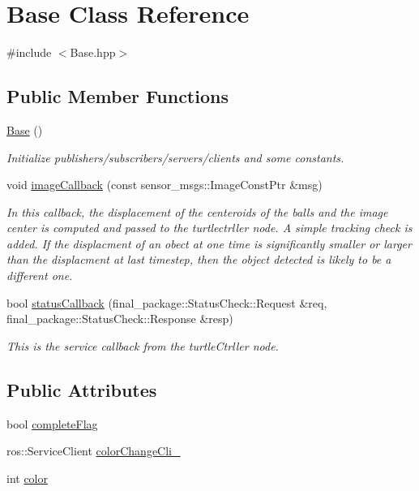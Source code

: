 \hypertarget{classBase}{}\section{Base Class Reference}
\label{classBase}


{\ttfamily \#include $<$Base.\+hpp$>$}

\subsection*{Public Member Functions}
\begin{DoxyCompactItemize}
\item 
\hyperlink{classBase_a5ffe0568374d8b9b4c4ec32953fd6453}{Base} ()
\begin{DoxyCompactList}\small\item\em Initialize publishers/subscribers/servers/clients and some constants. \end{DoxyCompactList}\item 
void \hyperlink{classBase_a07d8eb5e372ccab3c866c5abdce90d64}{image\+Callback} (const sensor\+\_\+msgs\+::\+Image\+Const\+Ptr \&msg)
\begin{DoxyCompactList}\small\item\em In this callback, the displacement of the centeroids of the balls and the image center is computed and passed to the turtlectrller node. A simple tracking check is added. If the displacment of an obect at one time is significantly smaller or larger than the displacment at last timestep, then the object detected is likely to be a different one. \end{DoxyCompactList}\item 
bool \hyperlink{classBase_a8b091924a7e8398ea11babdab370fd3f}{status\+Callback} (final\+\_\+package\+::\+Status\+Check\+::\+Request \&req, final\+\_\+package\+::\+Status\+Check\+::\+Response \&resp)
\begin{DoxyCompactList}\small\item\em This is the service callback from the turtle\+Ctrller node. \end{DoxyCompactList}\end{DoxyCompactItemize}
\subsection*{Public Attributes}
\begin{DoxyCompactItemize}
\item 
bool \hyperlink{classBase_a10b0afead866cc8cf2f5e2208a29d9f1}{complete\+Flag}
\item 
ros\+::\+Service\+Client \hyperlink{classBase_a874255744854a842b88ccab8674fca90}{color\+Change\+Cli\+\_\+}
\item 
int \hyperlink{classBase_af4c79a5d92200b5adf98634163333876}{color}
\end{DoxyCompactItemize}


